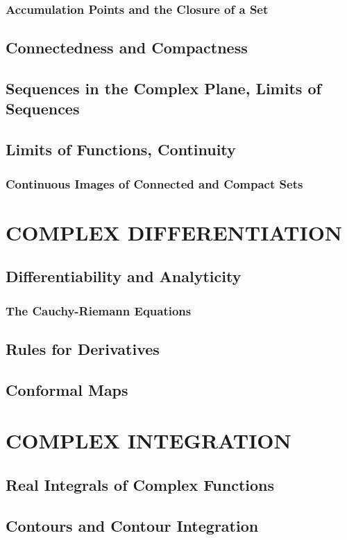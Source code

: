 \documentclass{refbook}
\begin{document}
\subsubsection{Accumulation Points and the Closure of a Set}
\subsection{Connectedness and Compactness}
\subsection{Sequences in the Complex Plane, Limits of Sequences}
\subsection{Limits of Functions, Continuity}
\subsubsection{Continuous Images of Connected and Compact Sets}


\section{COMPLEX DIFFERENTIATION}
\subsection{Differentiability and Analyticity}
\subsubsection{The Cauchy-Riemann Equations}
\subsection{Rules for Derivatives}
\subsection{Conformal Maps}


\section{COMPLEX INTEGRATION}
\subsection{Real Integrals of Complex Functions}
\subsection{Contours and Contour Integration}
\end{document}
